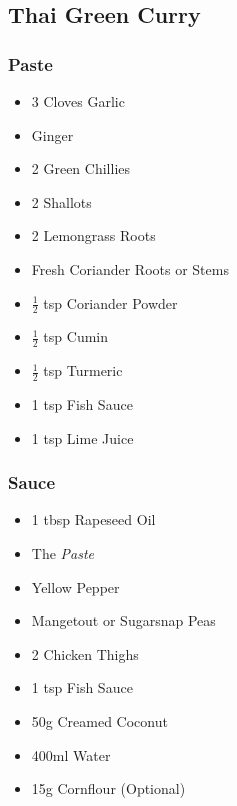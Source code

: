 \documentclass[11pt, english]{article}
\begin{document}
\newpage

	\subsection{Thai Green Curry}

		\subsubsection*{Paste}

	\begin{itemize}
        \setlength\itemsep{0cm}
                \item 3 Cloves Garlic
                \item Ginger
                \item 2 Green Chillies
                \item 2 Shallots
                \item 2 Lemongrass Roots
                \item Fresh Coriander Roots or Stems
		\item $\frac{1}{2}$ tsp Coriander Powder
                \item $\frac{1}{2}$ tsp Cumin
		\item $\frac{1}{2}$ tsp Turmeric
                \item 1 tsp Fish Sauce
                \item 1 tsp Lime Juice
        \end{itemize}

		\subsubsection*{Sauce}

	\begin{itemize}
        \setlength\itemsep{0cm}
                \item 1 tbsp Rapeseed Oil
                \item The \textit{Paste}
                \item Yellow Pepper
		\item Mangetout or Sugarsnap Peas
                \item 2 Chicken Thighs
                \item 1 tsp Fish Sauce
                \item 50g Creamed Coconut
		\item 400ml Water
		\item 15g Cornflour (Optional)
        \end{itemize}
\end{document}
